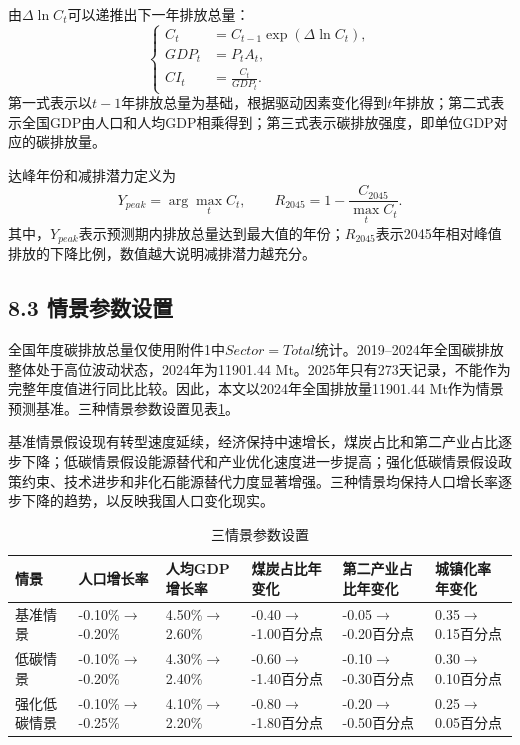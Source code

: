\documentclass[UTF8,zihao=-4,fontset=fandol]{ctexart}
\begin{document}
由$\Delta\ln C_t$可以递推出下一年排放总量：
\[
\left\{
\begin{aligned}
C_t&=C_{t-1}\exp(\Delta\ln C_t),\\
GDP_t&=P_tA_t,\\
CI_t&=\frac{C_t}{GDP_t}.
\end{aligned}
\right.
\]
第一式表示以$t-1$年排放总量为基础，根据驱动因素变化得到$t$年排放；第二式表示全国GDP由人口和人均GDP相乘得到；第三式表示碳排放强度，即单位GDP对应的碳排放量。

达峰年份和减排潜力定义为
\[
Y_{peak}=\arg\max_t C_t,\qquad
R_{2045}=1-\frac{C_{2045}}{\max_t C_t}.
\]
其中，$Y_{peak}$表示预测期内排放总量达到最大值的年份；$R_{2045}$表示2045年相对峰值排放的下降比例，数值越大说明减排潜力越充分。

\subsection*{8.3 情景参数设置}

全国年度碳排放总量仅使用附件1中$Sector=Total$统计。2019--2024年全国碳排放整体处于高位波动状态，2024年为11901.44 Mt。2025年只有273天记录，不能作为完整年度值进行同比比较。因此，本文以2024年全国排放量11901.44 Mt作为情景预测基准。三种情景参数设置见表\ref{tab:scenario_params}。

基准情景假设现有转型速度延续，经济保持中速增长，煤炭占比和第二产业占比逐步下降；低碳情景假设能源替代和产业优化速度进一步提高；强化低碳情景假设政策约束、技术进步和非化石能源替代力度显著增强。三种情景均保持人口增长率逐步下降的趋势，以反映我国人口变化现实。

\begin{table}[H]
\centering
\caption{三情景参数设置}
\label{tab:scenario_params}
\scriptsize
\begin{tabularx}{\textwidth}{lXXXXX}
\toprule
情景 & 人口增长率 & 人均GDP增长率 & 煤炭占比年变化 & 第二产业占比年变化 & 城镇化率年变化 \\
\midrule
基准情景 & -0.10\%$\rightarrow$-0.20\% & 4.50\%$\rightarrow$2.60\% & -0.40$\rightarrow$-1.00百分点 & -0.05$\rightarrow$-0.20百分点 & 0.35$\rightarrow$0.15百分点 \\
低碳情景 & -0.10\%$\rightarrow$-0.20\% & 4.30\%$\rightarrow$2.40\% & -0.60$\rightarrow$-1.40百分点 & -0.10$\rightarrow$-0.30百分点 & 0.30$\rightarrow$0.10百分点 \\
强化低碳情景 & -0.10\%$\rightarrow$-0.25\% & 4.10\%$\rightarrow$2.20\% & -0.80$\rightarrow$-1.80百分点 & -0.20$\rightarrow$-0.50百分点 & 0.25$\rightarrow$0.05百分点 \\
\bottomrule
\end{tabularx}
\end{table}
\end{document}
